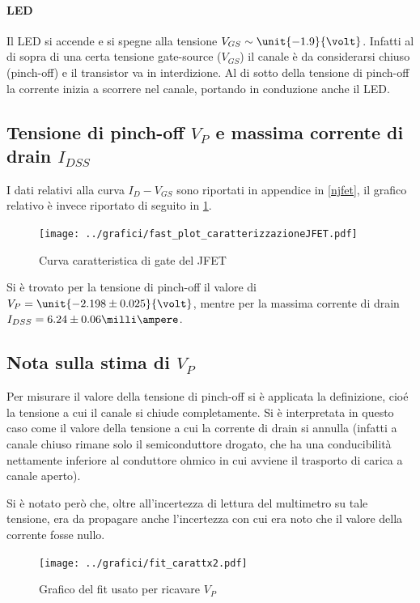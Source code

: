 \documentclass[10pt,a4paper]{article}
\begin{document}
\paragraph{LED} Il LED si accende e si spegne alla tensione $V_{GS} \sim \unit{-1.9}{\volt}$. Infatti al di sopra di una certa tensione gate-source ($V_{GS}$) il canale è da considerarsi chiuso (pinch-off) e il transistor va in interdizione. Al di sotto della tensione di pinch-off la corrente inizia a scorrere nel canale, portando in conduzione anche il LED.

\subsection{Tensione di pinch-off $V_P$ e massima corrente di drain $I_{DSS}$}
I dati relativi alla curva $I_D - V_{GS}$ sono riportati in appendice in \tablename{\ref{njfet}}, il grafico relativo è invece riportato di seguito in \figurename{\ref{fig:njfet}}.

\begin{figure}[h!]
	\centering
	\texttt{[image: ../grafici/fast\_plot\_caratterizzazioneJFET.pdf]}
	\caption{Curva caratteristica di gate del JFET}
	\label{fig:njfet}
\end{figure}

Si è trovato per la tensione di pinch-off il valore di $V_P = \unit{-2.198 \pm 0.025}{\volt} $, mentre per la massima corrente di drain $I_{DSS} = {6.24 \pm 0.06 }{\milli\ampere} $.

\subsection{Nota sulla stima di $V_P$}
Per misurare il valore della tensione di pinch-off si è applicata la definizione, cioé la tensione a cui il canale si chiude completamente. Si è interpretata in questo caso come il valore della tensione a cui la corrente di drain si annulla (infatti a canale chiuso rimane solo il semiconduttore drogato, che ha una conducibilità nettamente inferiore al conduttore ohmico in cui avviene il trasporto di carica a canale aperto).

Si è notato però che, oltre all'incertezza di lettura del multimetro su tale tensione, era da propagare anche l'incertezza con cui era noto che il valore della corrente fosse nullo.

\begin{figure}[h!]
	\centering
	\texttt{[image: ../grafici/fit\_carattx2.pdf]}
	\caption{Grafico del fit usato per ricavare $V_P$}
	\label{fig:vpfit}
\end{figure}
\end{document}
